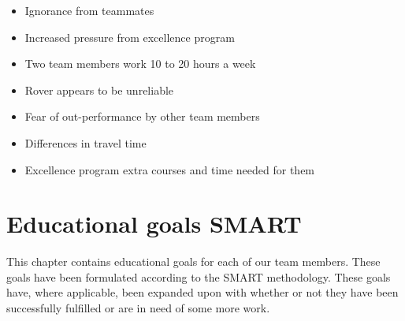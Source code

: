 \documentclass[12pt]{article}
\begin{document}
\begin{tcbitemize}[raster columns=3, raster rows=3, enhanced, sharp corners, raster equal height=rows, raster force size=false, raster column skip=0pt, raster row skip = 0pt]
		\tcbitem[swotbox=T]
		\begin{itemize}
			\item Ignorance from teammates
			\item Increased pressure from excellence program
			\item Two team members work 10 to 20 hours a week
			\item Rover appears to be unreliable
			\item Fear of out-performance by other team members
			\item Differences in travel time
			\item Excellence program extra courses and time needed for them
		\end{itemize}
	\end{tcbitemize}
	\newpage

	\section{Educational goals SMART}
	This chapter contains educational goals for each of our team members. These goals have been formulated according to the SMART methodology.
	These goals have, where applicable, been expanded upon with whether or not they have been successfully fulfilled or are in need of some more work.
\end{document}
